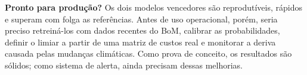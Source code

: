 \documentclass[conference,a4paper]{IEEEtran}
\begin{document}
\textbf{Pronto para produção?} Os dois modelos vencedores são reprodutíveis, rápidos e
superam com folga as referências. Antes de uso operacional, porém, seria preciso retreiná-los
com dados recentes do BoM, calibrar as probabilidades, definir o limiar a partir de uma matriz
de custos real e monitorar a deriva causada pelas mudanças climáticas. Como prova de conceito,
os resultados são sólidos; como sistema de alerta, ainda precisam dessas melhorias.



\end{document}
